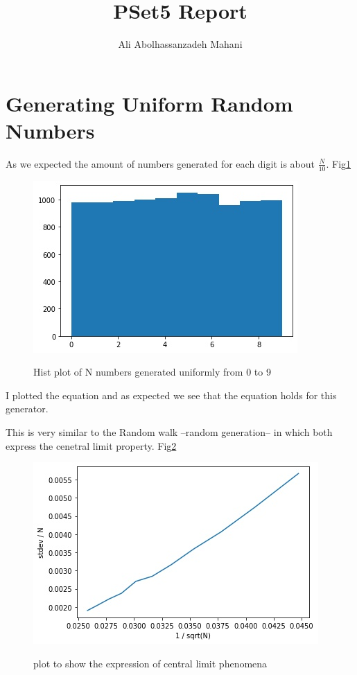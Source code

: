 \documentclass[12pt]{article}
\title{PSet5 Report}
\author{Ali Abolhassanzadeh Mahani}
\begin{document}
	\maketitle
	\section{Generating Uniform Random Numbers}
	As we expected the amount of numbers generated for each digit is about $\frac{N}{10}$. Fig\ref{fig:p1_hist}
	\begin{figure}[h!]
		\includegraphics[width=0.9\linewidth]{../p1_hist.jpg}
		\label{fig:p1_hist}
		\caption{Hist plot of N numbers generated uniformly from 0 to 9}
	\end{figure}
	I plotted the equation and as expected we see that the equation holds for this generator.
	
	This is very similar to the Random walk --random generation-- in which both express the cenetral limit property. Fig\ref{fig:p1_plot}
	\begin{figure}[h!]
	\includegraphics[width=0.9\linewidth]{../p1_plot.jpg}
	\label{fig:p1_plot}
	\caption{plot to show the expression of central limit phenomena}
\end{figure}
\end{document}
